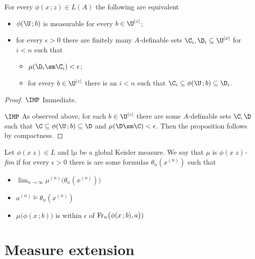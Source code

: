 \documentclass[creche.tex]{subfiles}
\begin{document}
\begin{proposition}
For every $\phi(x\,;z)\in L(A)$ the following are equivalent
\begin{itemize}
\item[1.] $\phi(\U\,;b)$ is measurable for every $b\in\U^{|z|}$;
\item[2.] for every $\epsilon>0$ there are finitely many $A$-definable sets $\C_i,\D_i\subseteq\U^{|x|}$ for $i<n$ such that
\begin{itemize}
\item[i.] $\mu(\D_i\sm\C_i)<\epsilon$;
\item[ii.] for every $b\in\U^{|z|}$ there is an $i<n$ such that $\C_i\subseteq\phi(\U\,;b)\subseteq\D_i$.
\end{itemize}
\end{itemize}
\end{proposition}
\begin{proof}
$\IMP$ Immediate.

$\IMP$ As observed above, for each $b\in\U^{|z|}$ there are some $A$-definable sets $\C,\D$ such that $\C\subseteq\phi(\U\,;b)\subseteq\D$ and $\mu(\D\sm\C)<\epsilon$.
Then the proposition follows by compactness.
\end{proof}
\def\Fr{{\rm Fr}}

\begin{definition}
Let  $\phi(x\;z)\in L$ and l$\mu$ be a global Keisler measure. We say that $\mu$ is \emph{$\phi(x\;z)$-fim\/} if for every $\epsilon>0$ there is are some formulas $\theta_n(x^{(n)})$ such that 
\begin{itemize}
\item[1.] $\displaystyle\lim_{n\to\infty}\mu^{(n)}\big(\theta_n(x^{(n)})\big)$
\item[2.] $a^{(n)}\models\theta_n(x^{(n)})$ 
\item[3.] $\mu\big(\phi(x\,;b)\big)$ is within $\epsilon$ of $\/\Fr_n\big(\phi(x\,;b),a\big))$
\end{itemize}

\end{definition}


\section{Measure extension}
\end{document}
